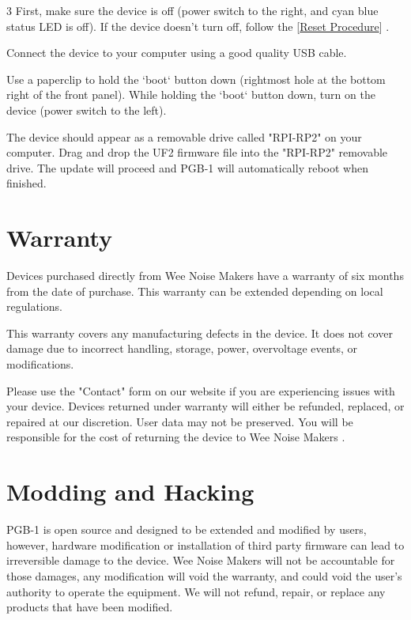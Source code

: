 \documentclass[8pt]{extarticle}
\def\device{PGB-1 }
\def\WNM{Wee Noise Makers }
\newcommand{\reflabel}[2]{
[\hyperref[#1]{#2}]
}
\begin{document}
\begin{multicols*}{3}
First, make sure the device is off (power switch to the right, and cyan blue status LED is off). If the device doesn't turn off, follow the \reflabel{procedures:reset}{Reset Procedure}.

Connect the device to your computer using a good quality USB cable.

Use a paperclip to hold the `boot` button down (rightmost hole at the bottom right of the front panel). While holding the `boot` button down, turn on the device (power switch to the left).

The device should appear as a removable drive called "RPI-RP2" on your computer. Drag and drop the UF2 firmware file into the "RPI-RP2" removable drive. The update will proceed and \device will automatically reboot when finished.

\section{Warranty}

Devices purchased directly from \WNM have a warranty of six months from the date of purchase. This warranty can be extended depending on local regulations.

This warranty covers any manufacturing defects in the device. It does not cover damage due to incorrect handling, storage, power, overvoltage events, or modifications.

Please use the "Contact" form on our website if you are experiencing issues with your device. Devices returned under warranty will either be refunded, replaced, or repaired at our discretion. User data may not be preserved. You will be responsible for the cost of returning the device to \WNM.

\section{Modding and Hacking}

\device is open source and designed to be extended and modified by users, however, hardware modification or installation of third party firmware can lead to irreversible damage to the device. \WNM will not be accountable for those damages, any modification will void the warranty, and could void the user’s authority to operate the equipment. We will not refund, repair, or replace any products that have been modified.

\end{multicols*}
\end{document}
